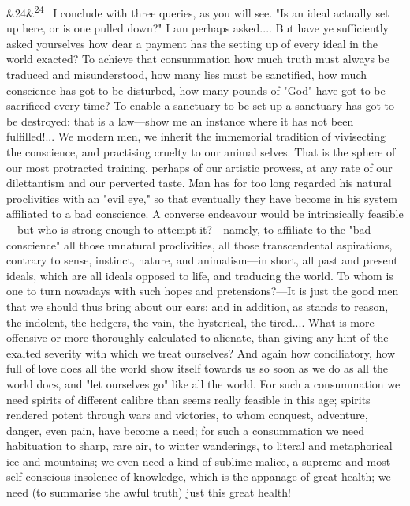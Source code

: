 \documentclass[12pt]{article}
\newcommand{\para}[1][]{\par\noindent\ifx&#1&\else\textsuperscript{\footnotesize #1}~\fi}
\begin{document}
\para[24] I conclude with three queries, as you will see. "Is an ideal actually set up here, or is one pulled down?" I am perhaps asked.... But have ye sufficiently asked yourselves how dear a payment has the setting up of every ideal in the world exacted? To achieve that consummation how much truth must always be traduced and misunderstood, how many lies must be sanctified, how much conscience has got to be disturbed, how many pounds of "God" have got to be sacrificed every time? To enable a sanctuary to be set up a sanctuary has got to be destroyed: that is a law---show me an instance where it has not been fulfilled!... We modern men, we inherit the immemorial tradition of vivisecting the conscience, and practising cruelty to our animal selves. That is the sphere of our most protracted training, perhaps of our artistic prowess, at any rate of our dilettantism and our perverted taste. Man has for too long regarded his natural proclivities with an "evil eye," so that eventually they have become in his system affiliated to a bad conscience. A converse endeavour would be intrinsically feasible ---but who is strong enough to attempt it?---namely, to affiliate to the "bad conscience" all those unnatural proclivities, all those transcendental aspirations, contrary to sense, instinct, nature, and animalism---in short, all past and present ideals, which are all ideals opposed to life, and traducing the world. To whom is one to turn nowadays with such hopes and pretensions?---It is just the good men that we should thus bring about our ears; and in addition, as stands to reason, the indolent, the hedgers, the vain, the hysterical, the tired.... What is more offensive or more thoroughly calculated to alienate, than giving any hint of the exalted severity with which we treat ourselves? And again how conciliatory, how full of love does all the world show itself towards us so soon as we do as all the world docs, and "let ourselves go" like all the world. For such a consummation we need spirits of different calibre than seems really feasible in this age; spirits rendered potent through wars and victories, to whom conquest, adventure, danger, even pain, have become a need; for such a consummation we need habituation to sharp, rare air, to winter wanderings, to literal and metaphorical ice and mountains; we even need a kind of sublime malice, a supreme and most self-conscious insolence of knowledge, which is the appanage of great health; we need (to summarise the awful truth) just this great health!
\end{document}
